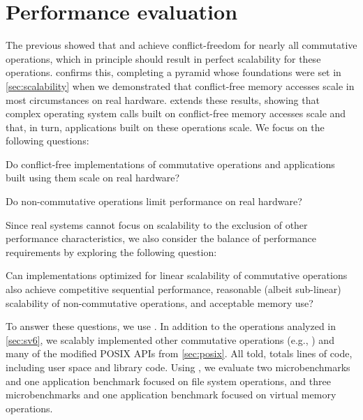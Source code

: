 \section{Performance evaluation}
\label{sec:eval}


The previous  showed that \fs and \vm achieve
conflict-freedom for nearly all commutative operations, which in
principle should result in perfect scalability for these operations.
%
 confirms this, completing a pyramid whose
foundations were set in \cref{sec:scalability} when we demonstrated
that conflict-free memory accesses scale in most circumstances on real
hardware.
%
 extends these results, showing that complex
operating system calls built on conflict-free memory accesses scale
and that, in turn, applications built on these operations scale.
%
We focus on the following questions:

\begin{CompactItemize}

\item Do conflict-free implementations of commutative operations and
  applications built using them scale on real hardware?

\item Do non-commutative operations limit performance on real
  hardware?


\end{CompactItemize}

Since real systems cannot focus on scalability to the exclusion of
other performance characteristics, we also consider the balance of
performance requirements by exploring the following question:

\begin{CompactItemize}

\item Can implementations optimized for linear scalability of
  commutative operations also achieve competitive sequential
  performance, reasonable (albeit sub-linear) scalability of
  non-commutative operations, and acceptable memory use?

\end{CompactItemize}


To answer these questions, we use \sys.
In addition to the operations analyzed in \cref{sec:sv6}, we scalably
implemented
other commutative operations (e.g., )
and many of the modified POSIX APIs from
\cref{sec:posix}.
%
All told, \sys
totals  lines of code, including user
space and library code.
%
Using \sys, we evaluate two microbenchmarks and one application
benchmark focused on file system operations, and three microbenchmarks
and one application benchmark focused on virtual memory operations.


